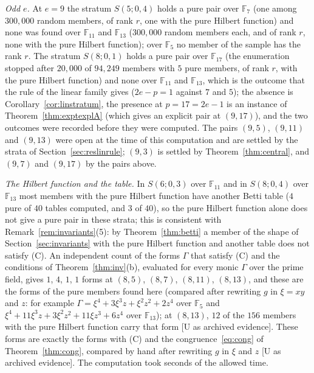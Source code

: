\documentclass[11pt]{article}
\theoremstyle{definition}
\theoremstyle{remark}
\newcommand{\F}{\mathbb{F}}
\begin{document}
\emph{Odd $e$.} At $e=9$ the stratum $S(5;0,4)$ holds a pure pair over $\F_7$ (one among $300{,}000$ random members, \nmidNineSevenORankR{} of rank $r$, one with the pure Hilbert function) and none was found over $\F_{11}$ and $\F_{13}$ ($300{,}000$ random members each, \nmidNineElevenORankR{} and \nmidNineThirteenORankR{} of rank $r$, none with the pure Hilbert function); over $\F_5$ no member of the sample has the rank $r$. The stratum $S(8;0,1)$ holds a pure pair over $\F_{17}$ (the enumeration stopped after $20{,}000$ of $94{,}249$ members with $5$ pure members, \nmidNineSeventeenLRankR{} of rank $r$, \nmidNineSeventeenLPureHF{} with the pure Hilbert function) and none over $\F_{11}$ and $\F_{13}$, which is the outcome that the rule of the linear family gives ($2e-p=1$ against $7$ and $5$); the absence is Corollary~\ref{cor:linstratum}, the presence at $p=17=2e-1$ is an instance of Theorem~\ref{thm:exptexplA} (which gives an explicit pair at $(9,17)$), and the two outcomes were recorded before they were computed. The pairs $(9,5)$, $(9,11)$ and $(9,13)$ were open at the time of this computation and are settled by the strata of Section~\ref{sec:reslinrule}; $(9,3)$ is settled by Theorem~\ref{thm:central}, and $(9,7)$ and $(9,17)$ by the pairs above.

\emph{The Hilbert function and the table.} In $S(6;0,3)$ over $\F_{11}$ and in $S(8;0,4)$ over $\F_{13}$ most members with the pure Hilbert function have another Betti table ($4$ pure of $40$ tables computed, and $3$ of $40$), so the pure Hilbert function alone does not give a pure pair in these strata; this is consistent with Remark~\ref{rem:invariants}(5): by Theorem~\ref{thm:betti} a member of the shape of Section~\ref{sec:invariants} with the pure Hilbert function and another table does not satisfy (C). An independent count of the forms $\Gamma$ that satisfy (C) and the conditions of Theorem~\ref{thm:inv}(b), evaluated for every monic $\Gamma$ over the prime field, gives $1$, $4$, $1$, $1$ forms at $(8,5)$, $(8,7)$, $(8,11)$, $(8,13)$, and these are the forms of the pure members found here (compared after rewriting $g$ in $\xi=xy$ and $z$: for example $\Gamma=\xi^4+3\xi^3z+\xi^2z^2+2z^4$ over $\F_5$ and $\xi^4+11\xi^3z+3\xi^2z^2+11\xi z^3+6z^4$ over $\F_{13}$); at $(8,13)$, $12$ of the $156$ members with the pure Hilbert function carry that form [U as archived evidence]. These forms are exactly the forms with (C) and the congruence~\eqref{eq:cong} of Theorem~\ref{thm:cong}, compared by hand after rewriting $g$ in $\xi$ and $z$ [U as archived evidence]. The computation took \nmidSeconds{} seconds of the allowed time.
\end{document}
